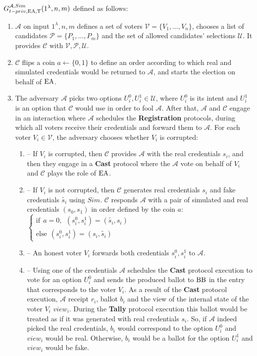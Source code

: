  $G_{t-priv,\operatorname{EA},\operatorname{T}}^{\mathcal{A}, Sim}(1^{\lambda},n,m)$ defined as follows:\\
\begin{enumerate}
\item $\mathcal{A}$ on input $1^{\lambda},n,m$ defines a set of voters  $\mathcal{V} = \{V_1,...,V_n\}$, chooses a list of candidates  $\mathcal{P} = \{P_1,...,P_m\}$ and the set of allowed candidates' selections $\mathcal{U}$.  It provides $\mathcal{C}$ with $\mathcal{V}, \mathcal{P}, \mathcal{U}$.
\item $\mathcal{C}$ flips a coin $a \leftarrow \{0,1\}$ to define an order according to which real and simulated credentials would be returned to $\mathcal{A}$, and starts the election on behalf of $\operatorname{EA}$. 
\item The adversary $\mathcal{A}$ picks two options $U^0_i,U^1_i \in \mathcal{U}$, where $U^0_i$ is its intent and $U^1_i$ is an option that $\mathcal{C}$ would use in order to fool $\mathcal{A}$.  After that, $\mathcal{A}$  and $\mathcal{C}$ engage in an interaction where $\mathcal{A}$ schedules the \textbf{Registration} protocols, during which all voters receive their credentials and forward them to  $\mathcal{A}$. For each voter $V_i \in \mathcal{V}$, the adversary chooses whether $V_i$ is corrupted:
\begin{enumerate}
\item[] -- If $V_i$ is corrupted, then $\mathcal{C}$ provides $\mathcal{A}$ with the real credentials $s_i$, and then they engage in a \textbf{Cast} protocol where the $\mathcal{A}$  vote on behalf of $V_i$ and  $\mathcal{C}$ plays the role of $\operatorname{EA}$.
\item[] --  If $V_i$ is not corrupted, then $\mathcal{C}$ generates real credentials $s_i$  and fake credentials $\tilde{s_i}$ using $Sim$.  $\mathcal{C}$  responds $\mathcal{A}$ with a pair of simulated and real credentials $(s_0,s_1)$ in order defined by the coin $a$:\\
$ \begin{cases}
 \text{if} ~~a =0,~~ (s^0_i,s^1_i) = (\tilde{s_i},s_i)  \\ 
 \text{else}~~  (s^0_i,s^1_i) = (s_i,\tilde{s_i})
\end{cases}$
 \item[] -- An honest voter $V_i$ forwards both credentials $s^0_i,s^1_i$ to $\mathcal{A}$.
\item[] -- Using one of the credentials $\mathcal{A}$ schedules the \textbf{Cast} protocol execution to vote for an option $U^0_i$ and sends the produced ballot to $\operatorname{BB}$ in the entry that corresponds to the voter $V_i$. As a result of the \textbf{Cast} protocol execution, $\mathcal{A}$  receipt $r_i$, ballot $b_i$ and the view of the internal state of the voter $V_i$ $view_i$.  During the \textbf{Tally} protocol execution this ballot would be treated as if it was generated with real credentials $s_i$. So, if  $\mathcal{A}$ indeed picked the real credentials, $b_i$ would correspond to the option   $U^0_i$  and $view_i$ would be real. Otherwise, $b_i$ would be a ballot for the option  $U^1_i$ and $view_i$ would be fake. 

\end{enumerate}
\end{enumerate}
